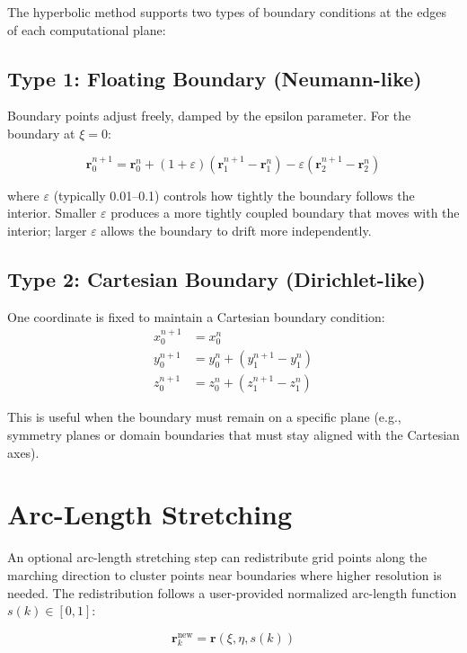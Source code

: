 \documentclass[11pt,a4paper]{report}
\newcommand{\rvec}{\bm{r}}
\begin{document}
The hyperbolic method supports two types of boundary conditions at the edges of each computational plane:

\subsection{Type 1: Floating Boundary (Neumann-like)}

Boundary points adjust freely, damped by the epsilon parameter. For the boundary at $\xi = 0$:

\begin{equation}
    \rvec_{0}^{n+1} = \rvec_{0}^{n} + (1 + \varepsilon)(\rvec_{1}^{n+1} - \rvec_{1}^{n}) - \varepsilon(\rvec_{2}^{n+1} - \rvec_{2}^{n})
\end{equation}

where $\varepsilon$ (typically 0.01--0.1) controls how tightly the boundary follows the interior. Smaller $\varepsilon$ produces a more tightly coupled boundary that moves with the interior; larger $\varepsilon$ allows the boundary to drift more independently.

\subsection{Type 2: Cartesian Boundary (Dirichlet-like)}

One coordinate is fixed to maintain a Cartesian boundary condition:
\begin{align}
    x_0^{n+1} &= x_0^{n} \\
    y_0^{n+1} &= y_0^{n} + (y_1^{n+1} - y_1^{n}) \\
    z_0^{n+1} &= z_0^{n} + (z_1^{n+1} - z_1^{n})
\end{align}

This is useful when the boundary must remain on a specific plane (e.g., symmetry planes or domain boundaries that must stay aligned with the Cartesian axes).

\section{Arc-Length Stretching}

An optional arc-length stretching step can redistribute grid points along the marching direction to cluster points near boundaries where higher resolution is needed. The redistribution follows a user-provided normalized arc-length function $s(k) \in [0, 1]$:

\begin{equation}
    \rvec_k^{\text{new}} = \rvec(\xi, \eta, s(k))
\end{equation}
\end{document}

